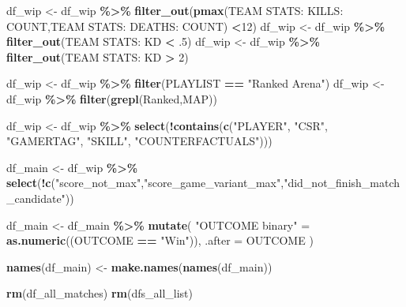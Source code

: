 \documentclass[
]{article}
\newenvironment{Shaded}{\begin{snugshade}}{\end{snugshade}}
\newcommand{\AttributeTok}[1]{\textcolor[rgb]{0.13,0.29,0.53}{#1}}
\newcommand{\DecValTok}[1]{\textcolor[rgb]{0.00,0.00,0.81}{#1}}
\newcommand{\FunctionTok}[1]{\textcolor[rgb]{0.13,0.29,0.53}{\textbf{#1}}}
\newcommand{\NormalTok}[1]{#1}
\newcommand{\OtherTok}[1]{\textcolor[rgb]{0.56,0.35,0.01}{#1}}
\newcommand{\SpecialCharTok}[1]{\textcolor[rgb]{0.81,0.36,0.00}{\textbf{#1}}}
\newcommand{\StringTok}[1]{\textcolor[rgb]{0.31,0.60,0.02}{#1}}
\begin{document}
\begin{Shaded}
\begin{Highlighting}[]
\NormalTok{df\_wip }\OtherTok{\textless{}{-}}\NormalTok{ df\_wip }\SpecialCharTok{\%\textgreater{}\%} \FunctionTok{filter\_out}\NormalTok{(}\FunctionTok{pmax}\NormalTok{(}\StringTok{\textasciigrave{}}\AttributeTok{TEAM STATS: KILLS: COUNT}\StringTok{\textasciigrave{}}\NormalTok{,}\StringTok{\textasciigrave{}}\AttributeTok{TEAM STATS: DEATHS: COUNT}\StringTok{\textasciigrave{}}\NormalTok{) }\SpecialCharTok{\textless{}}\DecValTok{12}\NormalTok{)}
\NormalTok{df\_wip }\OtherTok{\textless{}{-}}\NormalTok{ df\_wip }\SpecialCharTok{\%\textgreater{}\%} \FunctionTok{filter\_out}\NormalTok{(}\StringTok{\textasciigrave{}}\AttributeTok{TEAM STATS: KD}\StringTok{\textasciigrave{}} \SpecialCharTok{\textless{}}\NormalTok{ .}\DecValTok{5}\NormalTok{)}
\NormalTok{df\_wip }\OtherTok{\textless{}{-}}\NormalTok{ df\_wip }\SpecialCharTok{\%\textgreater{}\%} \FunctionTok{filter\_out}\NormalTok{(}\StringTok{\textasciigrave{}}\AttributeTok{TEAM STATS: KD}\StringTok{\textasciigrave{}} \SpecialCharTok{\textgreater{}} \DecValTok{2}\NormalTok{)}

\NormalTok{df\_wip }\OtherTok{\textless{}{-}}\NormalTok{ df\_wip }\SpecialCharTok{\%\textgreater{}\%} \FunctionTok{filter}\NormalTok{(PLAYLIST }\SpecialCharTok{==} \StringTok{"Ranked Arena"}\NormalTok{)}
\NormalTok{df\_wip }\OtherTok{\textless{}{-}}\NormalTok{ df\_wip }\SpecialCharTok{\%\textgreater{}\%} \FunctionTok{filter}\NormalTok{(}\FunctionTok{grepl}\NormalTok{(}\StringTok{\textquotesingle{}Ranked\textquotesingle{}}\NormalTok{,MAP))}

\NormalTok{df\_wip }\OtherTok{\textless{}{-}}\NormalTok{ df\_wip }\SpecialCharTok{\%\textgreater{}\%} \FunctionTok{select}\NormalTok{(}\SpecialCharTok{!}\FunctionTok{contains}\NormalTok{(}\FunctionTok{c}\NormalTok{(}\StringTok{"PLAYER"}\NormalTok{, }\StringTok{"CSR"}\NormalTok{, }\StringTok{"GAMERTAG"}\NormalTok{, }\StringTok{"SKILL"}\NormalTok{, }\StringTok{"COUNTERFACTUALS"}\NormalTok{)))}

\NormalTok{df\_main }\OtherTok{\textless{}{-}}\NormalTok{ df\_wip }\SpecialCharTok{\%\textgreater{}\%} \FunctionTok{select}\NormalTok{(}\SpecialCharTok{!}\FunctionTok{c}\NormalTok{(}\StringTok{"score\_not\_max"}\NormalTok{,}\StringTok{"score\_game\_variant\_max"}\NormalTok{,}\StringTok{"did\_not\_finish\_match\_candidate"}\NormalTok{))}

\NormalTok{df\_main }\OtherTok{\textless{}{-}}\NormalTok{ df\_main }\SpecialCharTok{\%\textgreater{}\%}
  \FunctionTok{mutate}\NormalTok{(}
    \StringTok{"OUTCOME binary"} \OtherTok{=} \FunctionTok{as.numeric}\NormalTok{((OUTCOME }\SpecialCharTok{==} \StringTok{"Win"}\NormalTok{)),}
    \AttributeTok{.after =}\NormalTok{ OUTCOME}
\NormalTok{  )}

\FunctionTok{names}\NormalTok{(df\_main) }\OtherTok{\textless{}{-}} \FunctionTok{make.names}\NormalTok{(}\FunctionTok{names}\NormalTok{(df\_main))}

\FunctionTok{rm}\NormalTok{(df\_all\_matches)}
\FunctionTok{rm}\NormalTok{(dfs\_all\_list)}
\end{Highlighting}
\end{Shaded}
\end{document}
